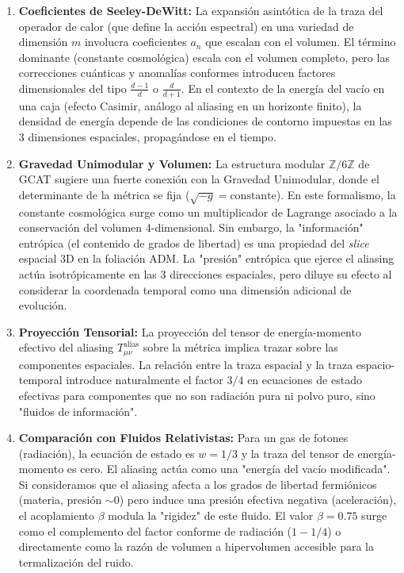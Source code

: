 \documentclass[12pt, a4paper]{article}
\theoremstyle{plain}
\theoremstyle{definition}
\begin{document}
\begin{enumerate}
    \item \textbf{Coeficientes de Seeley-DeWitt:} La expansión asintótica de la traza del operador de calor (que define la acción espectral) en una variedad de dimensión $m$ involucra coeficientes $a_n$ que escalan con el volumen. El término dominante (constante cosmológica) escala con el volumen completo, pero las correcciones cuánticas y anomalías conformes introducen factores dimensionales del tipo $\frac{d-1}{d}$ o $\frac{d}{d+1}$. En el contexto de la energía del vacío en una caja (efecto Casimir, análogo al aliasing en un horizonte finito), la densidad de energía depende de las condiciones de contorno impuestas en las 3 dimensiones espaciales, propagándose en el tiempo.
    
    \item \textbf{Gravedad Unimodular y Volumen:} La estructura modular $\mathbb{Z}/6\mathbb{Z}$ de GCAT sugiere una fuerte conexión con la Gravedad Unimodular, donde el determinante de la métrica se fija ($\sqrt{-g} = \text{constante}$). En este formalismo, la constante cosmológica surge como un multiplicador de Lagrange asociado a la conservación del volumen 4-dimensional. Sin embargo, la "información" entrópica (el contenido de grados de libertad) es una propiedad del \textit{slice} espacial 3D en la foliación ADM. La "presión" entrópica que ejerce el aliasing actúa isotrópicamente en las 3 direcciones espaciales, pero diluye su efecto al considerar la coordenada temporal como una dimensión adicional de evolución.
    
    \item \textbf{Proyección Tensorial:} La proyección del tensor de energía-momento efectivo del aliasing $T_{\mu\nu}^{\text{alias}}$ sobre la métrica implica trazar sobre las componentes espaciales. La relación entre la traza espacial y la traza espacio-temporal introduce naturalmente el factor $3/4$ en ecuaciones de estado efectivas para componentes que no son radiación pura ni polvo puro, sino "fluidos de información".
    
    \item \textbf{Comparación con Fluidos Relativistas:} Para un gas de fotones (radiación), la ecuación de estado es $w = 1/3$ y la traza del tensor de energía-momento es cero. El aliasing actúa como una "energía del vacío modificada". Si consideramos que el aliasing afecta a los grados de libertad fermiónicos (materia, presión $\sim 0$) pero induce una presión efectiva negativa (aceleración), el acoplamiento $\beta$ modula la "rigidez" de este fluido. El valor $\beta = 0.75$ surge como el complemento del factor conforme de radiación ($1 - 1/4$) o directamente como la razón de volumen a hipervolumen accesible para la termalización del ruido.
\end{enumerate}
\end{document}
